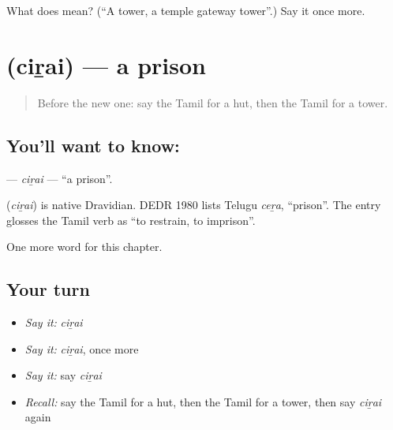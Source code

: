 \begin{tcolorbox}[breakable,colback=teal!4,colframe=teal!35!black,title={Before you move on}]
What does  mean? (\textquotedblleft{}A tower, a temple gateway tower\textquotedblright{}.) Say it once more.
\end{tcolorbox}
\section[\texorpdfstring{\ta{சிறை} (ciṟai)}{சிறை (ciṟai)}]{ (ciṟai) — a prison}

\label{lesson:TA-C265-cirai}



\begin{quote}
Before the new one: say the Tamil for a hut, then the Tamil for a tower.
\end{quote}

\subsection*{You'll want to know: }
\textbf{} — \emph{ciṟai} — \textquotedblleft{}a prison\textquotedblright{}.

\begin{cousinweb}
\textbf{} (\emph{ciṟai}) is native Dravidian. DEDR 1980 lists Telugu \emph{ceṟa}, \textquotedblleft{}prison\textquotedblright{}. The entry glosses the Tamil verb as \textquotedblleft{}to restrain, to imprison\textquotedblright{}.
\end{cousinweb}

\begin{grammarlens}[title={What you've built}]
One more word for this chapter.
\end{grammarlens}

\subsection*{Your turn}
\begin{itemize}
\raggedright
  \item \emph{Say it:} \emph{ciṟai}
  \item \emph{Say it:} \emph{ciṟai}, once more
  \item \emph{Say it:} say \emph{ciṟai}
  \item \emph{Recall:} say the Tamil for a hut, then the Tamil for a tower, then say \emph{ciṟai} again
\end{itemize}

